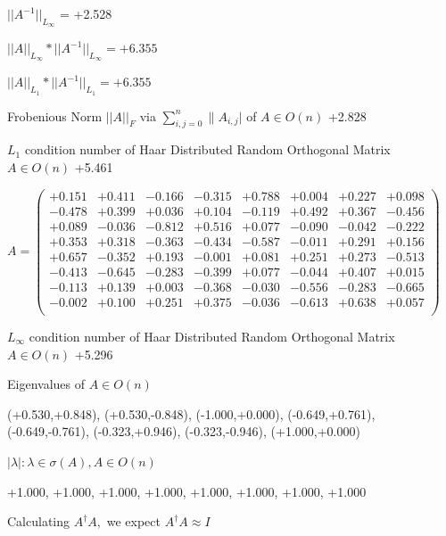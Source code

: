 \documentclass[9pt]{article}
\theoremstyle{plain}
\theoremstyle{definition}
\theoremstyle{remark}
\numberwithin{equation}{section}
\begin{document}
$||A^{-1}||_{L_{\infty}}$ = +2.528

$||A||_{L_{\infty}} * ||A^{-1}||_{L_{\infty}} = +6.355$

$||A||_{L_1} * ||A^{-1}||_{L_1} = +6.355$

Frobenious Norm  $||A||_{\textit{F}}$ via $\sum\limits_{i,j =0}^{n} \|A_{i,j}|$   of  $A \in O(n)$  +2.828

$L_1$ condition number of Haar Distributed Random Orthogonal Matrix $A \in O(n)$ +5.461

$A = \left(
\begin{array}{
cccccccc}
+0.151 & +0.411 & -0.166 & -0.315 & +0.788 & +0.004 & +0.227 & +0.098 \\
-0.478 & +0.399 & +0.036 & +0.104 & -0.119 & +0.492 & +0.367 & -0.456 \\
+0.089 & -0.036 & -0.812 & +0.516 & +0.077 & -0.090 & -0.042 & -0.222 \\
+0.353 & +0.318 & -0.363 & -0.434 & -0.587 & -0.011 & +0.291 & +0.156 \\
+0.657 & -0.352 & +0.193 & -0.001 & +0.081 & +0.251 & +0.273 & -0.513 \\
-0.413 & -0.645 & -0.283 & -0.399 & +0.077 & -0.044 & +0.407 & +0.015 \\
-0.113 & +0.139 & +0.003 & -0.368 & -0.030 & -0.556 & -0.283 & -0.665 \\
-0.002 & +0.100 & +0.251 & +0.375 & -0.036 & -0.613 & +0.638 & +0.057 \\
\end{array}
\right)$ \newline 

$L_{\infty}$ condition number of Haar Distributed Random Orthogonal Matrix $A \in O(n)$ +5.296

Eigenvalues of $A \in O(n)$

(+0.530,+0.848), (+0.530,-0.848), (-1.000,+0.000), (-0.649,+0.761), (-0.649,-0.761), (-0.323,+0.946), (-0.323,-0.946), (+1.000,+0.000)

 $|\lambda | : \lambda \in \sigma(A) , A \in O(n)$

+1.000, +1.000, +1.000, +1.000, +1.000, +1.000, +1.000, +1.000


Calculating $A^{\dag} A,$  we expect $A^{\dag} A \approx I$
\end{document}
